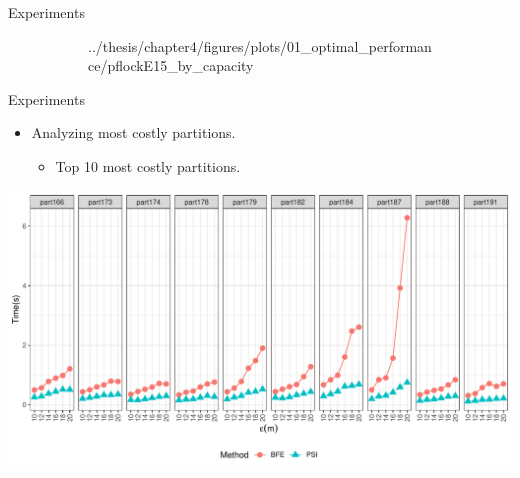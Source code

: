 \documentclass{beamer}
\begin{document}
\begin{frame}{Experiments}
\begin{figure}
\begin{subfigure}[t]{0.32\textwidth}
{                {../thesis/chapter4/figures/plots/01_optimal_performance/pflockE15_by_capacity}}
            \end{subfigure}
            \begin{subfigure}[t]{0.32\textwidth}
            \end{subfigure}
        \end{figure}
    \end{frame}

    \begin{frame}{Experiments}
        \begin{itemize} \item Analyzing most costly partitions. 
            \begin{itemize}
                \item Top 10 most costly partitions.
            \end{itemize}
        \end{itemize} \vspace{0.25cm}

        \centering
        \includegraphics[width=\textwidth]
                {../thesis/chapter4/figures/plots/03_top_time_partitions/top_time_partitions}

    \end{frame}
\end{document}
